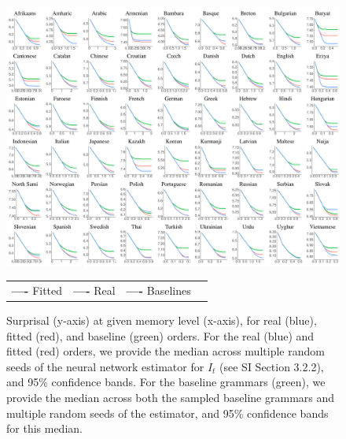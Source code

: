 \begin{figure}
	\begin{center}
\includegraphics[width=\textwidth]{results-table-mle.pdf}
\end{center}

\begin{center}
\begin{tabular}{llll}
\textbf{\textcolor{fitted}{----}} Fitted&
\textbf{\textcolor{real}{----}} Real&
\textbf{\textcolor{baseline}{----}} Baselines&
\end{tabular}
\end{center}
	\caption{Surprisal (y-axis) at given memory level (x-axis), for real (blue), fitted (red), and baseline (green) orders.
	For the real (blue) and fitted (red) orders, we provide the median across multiple random seeds of the neural network estimator for $I_t$ (see SI Section 3.2.2), and 95\% confidence bands.
	For the baseline grammars (green), we provide the median across both the sampled baseline grammars and multiple random seeds of the estimator, and 95\% confidence bands for this median.
}\label{fig:median-table-expt2}
\end{figure}


